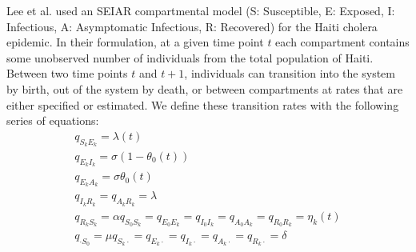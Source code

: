 \documentclass[12pt]{article}
\begin{document}
 Lee et al. used an SEIAR compartmental model (S: Susceptible, E: Exposed, I: Infectious, A: Asymptomatic Infectious, R: Recovered) for the Haiti cholera epidemic. In their formulation, at a given time point $t$ each compartment contains some unobserved number of individuals from the total population of Haiti. Between two time points $t$ and $t+1$, individuals can transition into the system by birth, out of the system by death, or between compartments at rates that are either specified or estimated. We define these transition rates with the following series of equations:
        \begin{eqnarray}
        \label{SE}
        q_{S_kE_k} = \lambda(t)
        \\
        \label{EI}
        q_{E_kI_k} = \sigma(1 - \theta_0(t))
        \\
        \label{EA}
        q_{E_kA_k} = \sigma\theta_0(t)
        \\
        \label{IR AR}
        q_{I_kR_k} = q_{A_kR_k} = \lambda
        \\
        \label{RS}
        q_{R_kS_k} = \alpha
        \label{vacc}
        q_{S_0S_k} = q_{E_0E_k} = q_{I_0I_k} = q_{A_0A_k} = q_{R_0R_k} = \eta_k(t)
        \\
        \label{birth}
        q_{\cdot S_0} = \mu
        \label{death}
        q_{S_k \cdot} = q_{E_k \cdot} = q_{I_k \cdot} = q_{A_k \cdot} = q_{R_k \cdot} = \delta
        \end{eqnarray}
        
\end{document}
